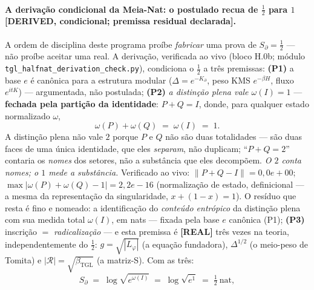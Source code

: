 \documentclass[12pt,a4paper]{article}
\newcommand{\betatgl}{\beta_{\text{TGL}}}
\begin{document}
\paragraph{A derivação condicional da Meia-Nat: o postulado recua de $\tfrac12$ para $1$ \textbf{[DERIVED, condicional; premissa residual declarada]}.} A ordem de disciplina deste programa proíbe \emph{fabricar} uma prova de $S_\partial = \tfrac12$ --- não proíbe aceitar uma real. A derivação, verificada ao vivo (bloco H.0b; módulo \texttt{tgl\_halfnat\_derivation\_check.py}), condiciona o $\tfrac12$ a três premissas: \textbf{(P1)} a base $e$ é canônica para a estrutura modular ($\Delta = e^{-K_\partial}$, peso KMS $e^{-\beta H}$, fluxo $e^{itK}$) --- argumentada, não postulada; \textbf{(P2)} \emph{a distinção plena vale $\omega(I) = 1$} --- \textbf{fechada pela partição da identidade}: $P + Q = I$, donde, para qualquer estado normalizado $\omega$,
\begin{equation}
\omega(P) + \omega(Q) \;=\; \omega(I) \;=\; 1.
\end{equation}
A distinção plena não vale $2$ porque $P$ e $Q$ não são duas totalidades --- são duas faces de uma única identidade, que eles \emph{separam}, não duplicam; ``$P+Q=2$'' contaria os \emph{nomes} dos setores, não a substância que eles decompõem. \emph{O $2$ conta nomes; o $1$ mede a substância.} Verificado ao vivo: $\lVert P+Q-I\rVert = 0{,}0e+00$; $\max|\omega(P)+\omega(Q)-1| = 2{,}2e-16$ (normalização de estado, definicional --- a mesma da representação da singularidade, $x+(1-x)=1$). O resíduo que resta é fino e nomeado: a identificação do \emph{conteúdo entrópico} da distinção plena com sua medida total $\omega(I)$, em nats --- fixada pela base $e$ canônica (P1); \textbf{(P3)} inscrição $=$ \emph{radicalização} --- e esta premissa é \textbf{[REAL]} três vezes na teoria, independentemente do $\tfrac12$: $g=\sqrt{|L_\varphi|}$ (a equação fundadora), $\Delta^{1/2}$ (o meio-peso de Tomita) e $|\mathcal R| = \sqrt{\betatgl}$ (a matriz-S). Com as três:
\begin{equation}
S_\partial \;=\; \log\!\sqrt{e^{\omega(I)}} \;=\; \log\!\sqrt{e^{1}} \;=\; \tfrac12\ \text{nat},
\end{equation}
\end{document}
